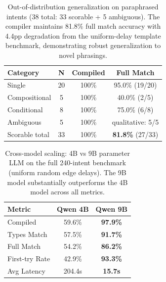 \begin{table}[t]
\centering
\caption{Out-of-distribution generalization on paraphrased intents
(38 total: 33 scorable + 5 ambiguous). The compiler maintains 81.8\%
full match accuracy with 4.4pp degradation from the uniform-delay
template benchmark, demonstrating robust generalization to novel phrasings.}
\label{tab:ood}
\begin{tabular}{lccc}
\toprule
\textbf{Category} & \textbf{N} & \textbf{Compiled} & \textbf{Full Match} \\
\midrule
Single         & 20 & 100\% & 95.0\% (19/20) \\
Compositional  & 5  & 100\% & 40.0\% (2/5)   \\
Conditional    & 8  & 100\% & 75.0\% (6/8)   \\
Ambiguous      & 5  & 100\% & qualitative: 5/5 \\
\midrule
Scorable total & 33 & 100\% & \textbf{81.8\%} (27/33) \\
\bottomrule
\end{tabular}
\end{table}

\begin{table}[t]
\centering
\caption{Cross-model scaling: 4B vs 9B parameter LLM on the full
240-intent benchmark (uniform random edge delays). The 9B model substantially outperforms the 4B
model across all metrics.}
\label{tab:cross_model}
\begin{tabular}{lcc}
\toprule
\textbf{Metric} & \textbf{Qwen 4B} & \textbf{Qwen 9B} \\
\midrule
Compiled       & 59.6\% & \textbf{97.9\%} \\
Types Match    & 57.5\% & \textbf{91.7\%} \\
Full Match     & 54.2\% & \textbf{86.2\%} \\
First-try Rate & 42.9\% & \textbf{93.3\%} \\
Avg Latency    & 204.4s & \textbf{15.7s}  \\
\bottomrule
\end{tabular}
\end{table}

